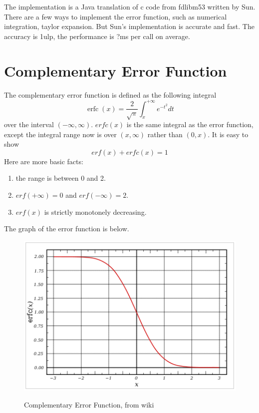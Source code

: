 The implementation is a Java translation of c code from fdlibm53 written by Sun. There are a few ways to implement the error function, such as numerical integration, taylor expansion. But Sun's implementation is accurate and fast. The accuracy is 1ulp, the performance is ?ms per call on average.

\section{Complementary Error Function}
The complementary error function is defined as the following integral
\[ \operatorname{erfc}(x) = \frac{2}{\sqrt{\pi}} \int_x^{+\infty} e^{-t^2}dt\]
over the interval $(-\infty, \infty)$. $erfc(x)$ is the same integral as the error function, except the integral range now is over $(x, \infty)$ rather than $(0, x)$. It is easy to show 
\[ erf(x) + erfc(x) = 1\]
Here are more basic facts:
\begin{enumerate}
\item the range is between 0 and 2.
\item $erf(+\infty) = 0$ and $erf(-\infty) = 2$.
\item $erf(x)$ is strictly monotonely decreasing.
\end{enumerate}
The graph of the error function is below. 
\begin{figure}[htp]
\begin{center}
{
\includegraphics[bb=-90 0 400 250,width=1\textwidth] {chap2/errorcfunction.png}
}
\end{center}
\caption{Complementary Error Function, from wiki}
\label{figure:errorcfunction}
\end{figure}

